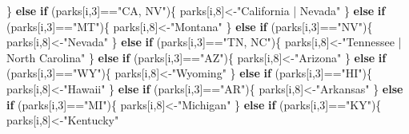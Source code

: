 \documentclass[
]{article}
\newenvironment{Shaded}{\begin{snugshade}}{\end{snugshade}}
\newcommand{\ControlFlowTok}[1]{\textcolor[rgb]{0.13,0.29,0.53}{\textbf{#1}}}
\newcommand{\DecValTok}[1]{\textcolor[rgb]{0.00,0.00,0.81}{#1}}
\newcommand{\NormalTok}[1]{#1}
\newcommand{\OtherTok}[1]{\textcolor[rgb]{0.56,0.35,0.01}{#1}}
\newcommand{\SpecialCharTok}[1]{\textcolor[rgb]{0.00,0.00,0.00}{#1}}
\newcommand{\StringTok}[1]{\textcolor[rgb]{0.31,0.60,0.02}{#1}}
\begin{document}
\begin{Shaded}
\begin{Highlighting}[]
\NormalTok{  \}}
  \ControlFlowTok{else} \ControlFlowTok{if}\NormalTok{ (parks[i,}\DecValTok{3}\NormalTok{]}\SpecialCharTok{==}\StringTok{"CA, NV"}\NormalTok{)\{}
\NormalTok{    parks[i,}\DecValTok{8}\NormalTok{]}\OtherTok{\textless{}{-}}\StringTok{"California | Nevada"}
\NormalTok{  \}}
  \ControlFlowTok{else} \ControlFlowTok{if}\NormalTok{ (parks[i,}\DecValTok{3}\NormalTok{]}\SpecialCharTok{==}\StringTok{"MT"}\NormalTok{)\{}
\NormalTok{    parks[i,}\DecValTok{8}\NormalTok{]}\OtherTok{\textless{}{-}}\StringTok{"Montana"}
\NormalTok{  \}}
  \ControlFlowTok{else} \ControlFlowTok{if}\NormalTok{ (parks[i,}\DecValTok{3}\NormalTok{]}\SpecialCharTok{==}\StringTok{"NV"}\NormalTok{)\{}
\NormalTok{    parks[i,}\DecValTok{8}\NormalTok{]}\OtherTok{\textless{}{-}}\StringTok{"Nevada"}
\NormalTok{  \}}
  \ControlFlowTok{else} \ControlFlowTok{if}\NormalTok{ (parks[i,}\DecValTok{3}\NormalTok{]}\SpecialCharTok{==}\StringTok{"TN, NC"}\NormalTok{)\{}
\NormalTok{    parks[i,}\DecValTok{8}\NormalTok{]}\OtherTok{\textless{}{-}}\StringTok{"Tennessee | North Carolina"}
\NormalTok{  \}}
  \ControlFlowTok{else} \ControlFlowTok{if}\NormalTok{ (parks[i,}\DecValTok{3}\NormalTok{]}\SpecialCharTok{==}\StringTok{"AZ"}\NormalTok{)\{}
\NormalTok{    parks[i,}\DecValTok{8}\NormalTok{]}\OtherTok{\textless{}{-}}\StringTok{"Arizona"}
\NormalTok{  \}}
  \ControlFlowTok{else} \ControlFlowTok{if}\NormalTok{ (parks[i,}\DecValTok{3}\NormalTok{]}\SpecialCharTok{==}\StringTok{"WY"}\NormalTok{)\{}
\NormalTok{    parks[i,}\DecValTok{8}\NormalTok{]}\OtherTok{\textless{}{-}}\StringTok{"Wyoming"}
\NormalTok{  \}}
  \ControlFlowTok{else} \ControlFlowTok{if}\NormalTok{ (parks[i,}\DecValTok{3}\NormalTok{]}\SpecialCharTok{==}\StringTok{"HI"}\NormalTok{)\{}
\NormalTok{    parks[i,}\DecValTok{8}\NormalTok{]}\OtherTok{\textless{}{-}}\StringTok{"Hawaii"}
\NormalTok{  \}}
  \ControlFlowTok{else} \ControlFlowTok{if}\NormalTok{ (parks[i,}\DecValTok{3}\NormalTok{]}\SpecialCharTok{==}\StringTok{"AR"}\NormalTok{)\{}
\NormalTok{    parks[i,}\DecValTok{8}\NormalTok{]}\OtherTok{\textless{}{-}}\StringTok{"Arkansas"}
\NormalTok{  \}}
  \ControlFlowTok{else} \ControlFlowTok{if}\NormalTok{ (parks[i,}\DecValTok{3}\NormalTok{]}\SpecialCharTok{==}\StringTok{"MI"}\NormalTok{)\{}
\NormalTok{    parks[i,}\DecValTok{8}\NormalTok{]}\OtherTok{\textless{}{-}}\StringTok{"Michigan"}
\NormalTok{  \}}
  \ControlFlowTok{else} \ControlFlowTok{if}\NormalTok{ (parks[i,}\DecValTok{3}\NormalTok{]}\SpecialCharTok{==}\StringTok{"KY"}\NormalTok{)\{}
\NormalTok{    parks[i,}\DecValTok{8}\NormalTok{]}\OtherTok{\textless{}{-}}\StringTok{"Kentucky"}

\end{Highlighting}
\end{Shaded}
\end{document}
